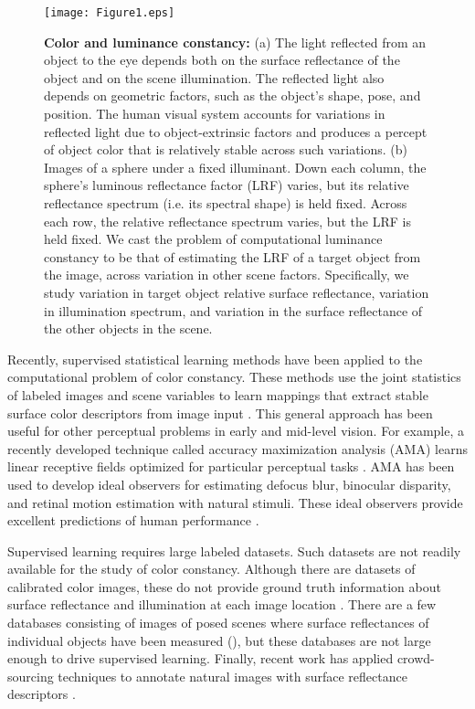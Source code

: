 \documentclass{jov}
\begin{document}
\begin{figure}
\centering
\texttt{[image: Figure1.eps]}    
    \caption{{\bf Color and luminance constancy:} (a)  The light reflected from an object to the eye depends both on the surface reflectance of the object and on the scene illumination. 
The reflected light also depends on geometric factors, such as the object's shape, pose, and position. 
The human visual system accounts for variations in reflected light due to object-extrinsic factors and produces a percept of object color that is relatively stable across such variations. 
(b) Images of a sphere under a fixed illuminant.  
Down each column, the sphere's luminous reflectance factor (LRF) varies, but its relative reflectance spectrum (i.e. its spectral shape) is held fixed.
Across each row, the relative reflectance spectrum varies, but the LRF is held fixed.
We cast the problem of computational luminance constancy to be that of estimating the LRF of a target object from the image, across variation in other scene factors. 
Specifically, we study variation in target object relative surface reflectance, variation in illumination spectrum, and variation in the surface reflectance of the other objects in the scene.}
\label{fig:introFigure}
 \end{figure}

Recently, supervised statistical learning methods have been applied to the computational problem of color constancy.
These methods use the joint statistics of labeled images and scene variables to learn mappings that extract stable surface color descriptors from image input \cite{barron2015convolutional}.
This general approach has been useful for other perceptual problems in early and mid-level vision.
For example, a recently developed technique called accuracy maximization analysis (AMA) learns linear receptive fields optimized for particular perceptual tasks \cite{geisler2009optimal,burge2017accuracy,jaini2017linking}. AMA has been used to develop ideal observers for estimating defocus blur, binocular disparity, and retinal motion estimation with natural stimuli. These ideal observers provide excellent predictions of human performance \cite{burge2011optimal, burge2012optimal, burge2014optimal, burge2015optimal}.

Supervised learning requires large labeled datasets. Such datasets are not readily available for the study of color constancy. Although there are datasets of calibrated color images, these do not provide ground truth information about surface reflectance and illumination at each image location \cite{ChakrabartiHyperspectral,NascimentoFoster2016,ParragaHyperspectralData,TkacikUpennHypersepctralData,skauli2013collection,olmos2004biologically}. There are a few databases consisting of images of posed scenes where surface reflectances of individual objects have been measured (), but these databases are not large enough to drive supervised learning. Finally, recent work has applied crowd-sourcing techniques to annotate natural images with surface reflectance descriptors \cite{bell2014intrinsic}.
 
\end{document}
